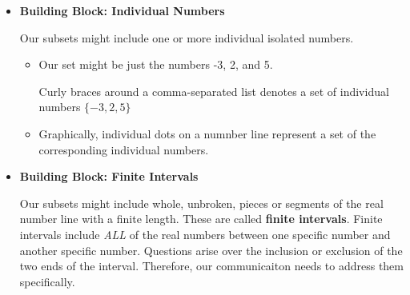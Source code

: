 \documentclass{ximera}
\begin{document}
\begin{itemize}
\item \textbf{Building Block: Individual Numbers}

Our subsets might include one or more individual isolated numbers.  
	\begin{itemize}
	\item Our set might be just the numbers -3, 2, and 5.

	Curly braces around a comma-separated list denotes a set of individual numbers $\{ -3, 2, 5 \}$

	\item Graphically, individual dots on a numnber line represent a set of the corresponding individual numbers.

	\begin{image}
	\end{image}



	\end{itemize}



\item  \textbf{Building Block: Finite Intervals}

Our subsets might include whole, unbroken, pieces or segments of the real number line with a finite length.  These are called \textbf{ finite intervals}.   Finite intervals include \textit{ALL} of the real numbers between one specific number and another specific number.  Questions arise over the inclusion or exclusion of the two ends of the interval. Therefore, our communicaiton needs to address them specifically.


\end{itemize}
\end{document}
